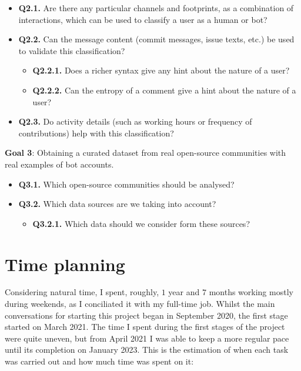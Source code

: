\documentclass[a4paper, 12pt]{book}
\begin{document}
\begin{itemize}
    \item \textbf{Q2.1.} Are there any particular channels and footprints, as a combination of interactions, which can be used to classify a user as a human or bot?
    \item \textbf{Q2.2.} Can the message content (commit messages, issue texts, etc.) be used to validate this classification?
    \begin{itemize}
        \item \textbf{Q2.2.1.} Does a richer syntax give any hint about the nature of a user? 
        \item \textbf{Q2.2.2.} Can the entropy of a comment give a hint about the nature of a user?
    \end{itemize}
    \item \textbf{Q2.3.} Do activity details (such as  working hours or frequency of contributions) help with this classification?

\end{itemize}

\textbf{Goal 3}: Obtaining a curated dataset from real open-source communities with real examples of bot accounts.

\begin{itemize}
    \item \textbf{Q3.1.} Which open-source communities should be analysed?
    \item \textbf{Q3.2.} Which data sources are we taking into account?
    \begin{itemize}
        \item \textbf{Q3.2.1.} Which data should we consider form these sources?
    \end{itemize}
\end{itemize}

\section{Time planning}
\label{sec:time-planning}


Considering natural time, I spent, roughly, $1$ year and $7$ months working mostly 
during weekends, as I conciliated it with my full-time job. Whilst the main conversations for starting this project began in September 2020, the first stage started on March 2021. The time I spent during the first stages of the project were quite uneven, but from April 2021 I was able to keep a more regular pace until its completion on January 2023. This is the estimation of when each task was carried out and how much time was spent on it:
\end{document}
